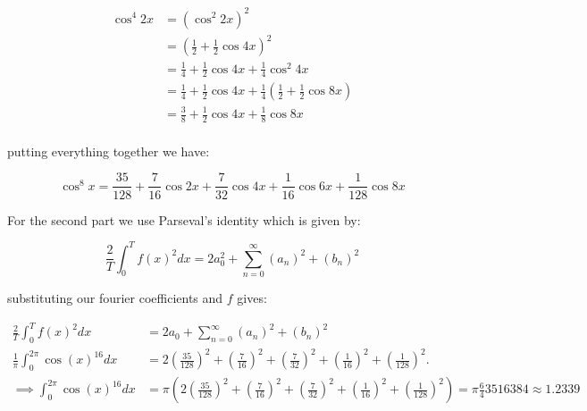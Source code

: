 \documentclass[11pt]{article}
\begin{document}
\begin{solution}
\begin{align*}
\cos^4 2x &= (\cos^2 2x)^2\\
&=(\frac 1 2 + \frac 1 2 \cos 4x)^2\\
&= \frac 1 4 + \frac 1 2 \cos 4x + \frac 1 4 \cos^2 4x\\
&= \frac 1 4 + \frac 1 2 \cos 4x + \frac 1 4 (\frac 1 2 + \frac 1 2 \cos 8x)\\
&= \frac 3 8 + \frac 1 2 \cos 4x + \frac 1 8 \cos 8x\\
\end{align*}

putting everything together we have:

$$
\cos^8x  = \frac{35}{128} + \frac{7}{16}\cos 2x + \frac{7}{32}\cos 4x + \frac{1}{16} \cos 6x + \frac{1}{128}\cos 8x
$$

For the second part we use Parseval's identity which is given by: 

$$
\frac{2}{T} \int_0^T f(x)^2 d x=2 a_0^2+\sum_{n=0}^{\infty}\left(a_n\right)^2+\left(b_n\right)^2
$$

substituting our fourier coefficients and $f$ gives: 

\begin{align*}
\frac{2}{T} \int_0^T f(x)^2 d x&=2 a_0+\sum_{n=0}^{\infty}\left(a_n\right)^2+\left(b_n\right)^2\\
\frac{1}{\pi} \int_0^{2\pi} \cos(x)^{16} d x&= 2\left(\frac{35}{128}\right)^2 + \left(\frac{7}{16}\right)^2 + \left(\frac{7}{32}\right)^2 + \left(\frac{1}{16}\right)^2 + \left(\frac{1}{128}\right)^2.\\
\implies \int_0^{2\pi} \cos(x)^{16} d x&= \pi\left(2\left(\frac{35}{128}\right)^2 + \left(\frac{7}{16}\right)^2 + \left(\frac{7}{32}\right)^2 + \left(\frac{1}{16}\right)^2 + \left(\frac{1}{128}\right)^2\right) = \pi\frac 6435 16384 \approx 1.2339\\
\end{align*}

\end{solution}
\end{document}
